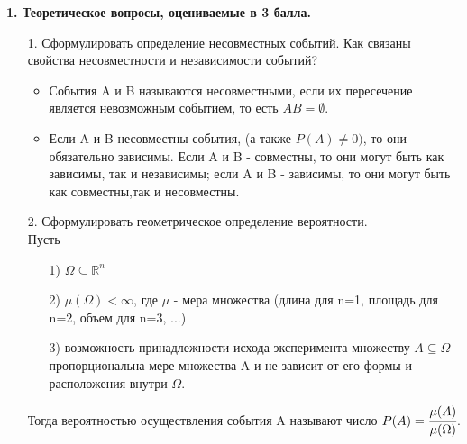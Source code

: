 \documentclass[a4paper]{article}
\begin{document}
\begin{center}
\Large
\textbf{1. Теоретическое вопросы, оцениваемые в 3 балла.} \\
\normalsize
\end{center}



\begin{enumerate}
\item[1.] Сформулировать определение несовместных событий. Как связаны свойства несовместности и независимости событий? \\
\begin{itemize}
\item События A и B называются несовместными, если их пересечение является невозможным 		событием, то есть $AB = \emptyset$. \\
	
\item Если A и B несовместны события, (а также $P(A) \neq 0)$, то они обязательно зависимы. Если A и B - совместны, то они могут быть как зависимы, так и независимы; если A и B - зависимы, то они могут быть как совместны,так и несовместны. \\
\end{itemize}



\item[2.] Сформулировать геометрическое определение вероятности. \\
Пусть
\begin{enumerate}
\item[1)] $\Omega \subseteq \mathbb{R}^n$ \\

\item[2)] $\mu (\Omega) < \infty$, где $\mu$ - мера множества (длина для n=1, площадь для n=2, объем для n=3, ...) \\

\item[3)] возможность принадлежности исхода эксперимента множеству $A \subseteq \Omega$ пропорциональна мере множества A и не зависит от его формы и расположения внутри $\Omega$. \\
\end{enumerate}
Тогда вероятностью осуществления события A называют число $P(A) = \cfrac{\mu(A)}{\mu(\Omega)}$. \\




\end{enumerate}
\end{document}
